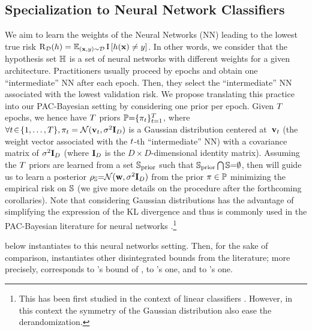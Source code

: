 \subsection{Specialization to Neural Network Classifiers}
\label{chap:dis-pra:sec:training-method}

We aim to learn the weights of the Neural Networks (NN) leading to the lowest true risk $\Risk_{\D}(\h)=\EE_{(\x,\y)\sim\D}\indic\LB \h(\x)\ne \y\RB$.
In other words, we consider that the hypothesis set $\H$ is a set of neural networks with different weights for a given architecture.
Practitioners usually proceed by epochs and obtain one ``intermediate''  NN after each epoch.
Then, they select the ``intermediate''  NN associated with the lowest validation risk.
We propose translating this practice into our PAC-Bayesian setting by considering one prior per epoch.
Given $\iter$ epochs, we hence have
$\iter$ priors $\priorset{=}\{\P_\t\}_{\t=1}^\iter$, where \mbox{$\forall \t\!\in\!\{1,\ldots,\iter\}, \P_\t=\Ncal(\vbf_\t, \sigma^2\Ibf_{D})$} is a Gaussian distribution centered \mbox{at $\vbf_\t$} (the weight vector associated with the \mbox{$\t$-th} ``intermediate''  NN) with a covariance matrix of $\sigma^2\Ibf_{D}$ (where $\Ibf_{D}$ is the $D{\times}D$-dimensional identity matrix).
Assuming the $\iter$ priors are learned from a set $\S_{\text{prior}}$ such that \mbox{$\S_{\text{prior}} \bigcap \S {=} \emptyset$}, then 
 will guide us to learn a posterior \mbox{$\AQ{=}\Ncal(\wbf, \sigma^2\Ibf_{D})$} from the prior $\P\in\priorset$ minimizing the empirical risk on $\S$ (we give more details on the procedure after the forthcoming corollaries).
Note that considering Gaussian distributions has the advantage of simplifying the expression of the KL divergence and thus is commonly used in the PAC-Bayesian literature for neural networks \citep[\eg, ][]{DziugaiteRoy2017,LetarteGermainGuedjLaviolette2019,ZhouVeitchAusternAdamsOrbanz2019}.\footnote{This has been first studied in  the context of linear classifiers \citep[\eg, ][]{AmbroladzeHernandezTaylor2006,GermainLacasseLavioletteMarchand2009,GermainHabrardLavioletteMorvant2020}.
However, in this context the symmetry of the Gaussian distribution also ease the derandomization.}

 below instantiates  to this neural networks setting.
Then, for the sake of comparison,  instantiates other disintegrated bounds from the literature; more precisely,  corresponds to \citet{RivasplataKuzborskijSzepesvariShaweTaylor2020}'s bound of ,  to \citet{BlanchardFleuret2007}'s one,  and  to \citet{Catoni2007}'s one.

